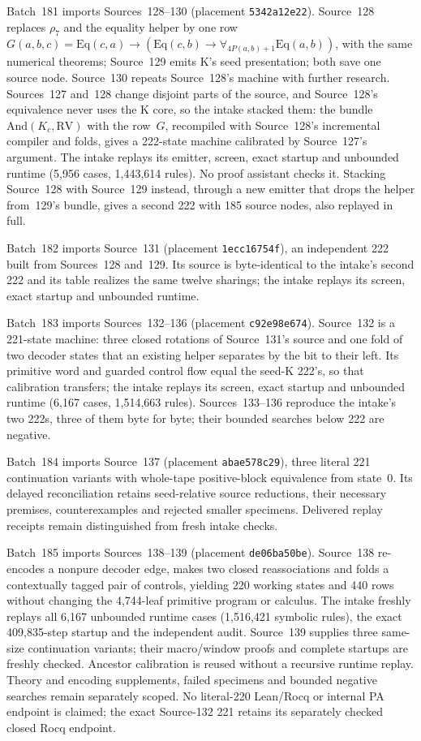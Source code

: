 \documentclass[11pt]{article}
\begin{document}
{Batch~181 imports Sources~128--130 (placement \texttt{5342a12e22}). Source~128 replaces
$\rho_7$ and the equality helper by one row
$G(a,b,c)=\mathrm{Eq}(c,a)\to(\mathrm{Eq}(c,b)\to\forall_{4P(a,b)+1}\mathrm{Eq}(a,b))$,
with the same numerical theorems; Source~129 emits K's seed presentation; both save one
source node. Source~130 repeats Source~128's machine with further research. Sources~127
and~128 change disjoint parts of the source, and Source~128's equivalence never uses the K
core, so the intake stacked them: the bundle $\mathrm{And}(K_c,\mathrm{RV})$ with the row~$G$,
recompiled with Source~128's incremental compiler and folds, gives a 222-state machine
calibrated by Source~127's argument. The intake replays its emitter, screen, exact startup
and unbounded runtime (5,956 cases, 1,443,614 rules). No proof assistant checks it.
Stacking Source~128 with Source~129 instead, through a new emitter that drops the helper
from~129's bundle, gives a second 222 with 185 source nodes, also replayed in full.

Batch~182 imports Source~131 (placement \texttt{1ecc16754f}), an independent 222 built
from Sources~128 and~129. Its source is byte-identical to the intake's second 222 and its
table realizes the same twelve sharings; the intake replays its screen, exact startup and
unbounded runtime.

Batch~183 imports Sources~132--136 (placement \texttt{c92e98e674}). Source~132 is a
221-state machine: three closed rotations of Source~131's source and one fold of two decoder
states that an existing helper separates by the bit to their left. Its primitive word and
guarded control flow equal the seed-K 222's, so that calibration transfers; the intake
replays its screen, exact startup and unbounded runtime (6,167 cases, 1,514,663 rules).
Sources~133--136 reproduce the intake's two 222s, three of them byte for byte; their bounded
searches below 222 are negative.

Batch~184 imports Source~137 (placement \texttt{abae578c29}), three literal 221
continuation variants with whole-tape positive-block equivalence from state~0.
Its delayed reconciliation retains seed-relative source reductions, their
necessary premises, counterexamples and rejected smaller specimens. Delivered
replay receipts remain distinguished from fresh intake checks.

Batch~185 imports Sources~138--139 (placement \texttt{de06ba50be}). Source~138
re-encodes a nonpure decoder edge, makes two closed reassociations and folds a
contextually tagged pair of controls, yielding 220 working states and 440 rows
without changing the 4,744-leaf primitive program or calculus. The intake
freshly replays all 6,167 unbounded runtime cases (1,516,421 symbolic rules),
the exact 409,835-step startup and the independent audit. Source~139 supplies
three same-size continuation variants; their macro/window proofs and complete
startups are freshly checked. Ancestor calibration is reused without a recursive
runtime replay. Theory and encoding supplements, failed specimens and bounded
negative searches remain separately scoped. No literal-220 Lean/Rocq or
internal PA endpoint is claimed; the exact Source-132 221 retains its separately
checked closed Rocq endpoint.

}
\end{document}
